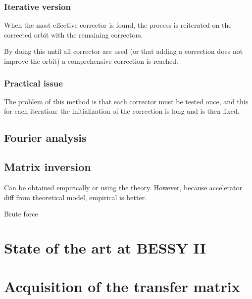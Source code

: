 \subsubsection{Iterative version}
When the most effective corrector is found, the process is reiterated on the corrected orbit with the remaining correctors. 

By doing this until all corrector are used (or that adding a correction does not improve the orbit) a comprehensive correction is reached.

\subsubsection{Practical issue}
The problem of this method is that each corrector must be tested once, and this for each iteration: the initialization of the correction is long and is then fixed.

\subsection{Fourier analysis}

\subsection{Matrix inversion}
Can be obtained empirically or using the theory. However, because accelerator diff from theoretical model, empirical is better. \cite{art:decker-1991}

Brute force
\section{State of the art at BESSY II}
\section{Acquisition of the transfer matrix}
